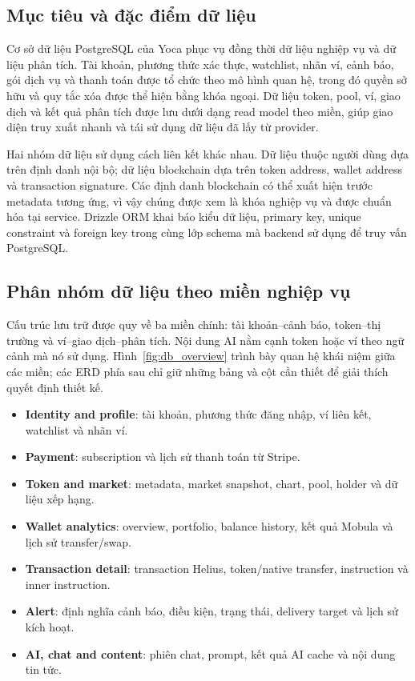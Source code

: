 \subsection{Mục tiêu và đặc điểm dữ liệu}
\label{subsec:db_muc_tieu}

Cơ sở dữ liệu PostgreSQL của Yoca phục vụ đồng thời dữ liệu nghiệp vụ và dữ liệu phân tích. Tài khoản, phương thức xác thực, watchlist, nhãn ví, cảnh báo, gói dịch vụ và thanh toán được tổ chức theo mô hình quan hệ, trong đó quyền sở hữu và quy tắc xóa được thể hiện bằng khóa ngoại. Dữ liệu token, pool, ví, giao dịch và kết quả phân tích được lưu dưới dạng read model theo miền, giúp giao diện truy xuất nhanh và tái sử dụng dữ liệu đã lấy từ provider.

Hai nhóm dữ liệu sử dụng cách liên kết khác nhau. Dữ liệu thuộc người dùng dựa trên định danh nội bộ; dữ liệu blockchain dựa trên token address, wallet address và transaction signature. Các định danh blockchain có thể xuất hiện trước metadata tương ứng, vì vậy chúng được xem là khóa nghiệp vụ và được chuẩn hóa tại service. Drizzle ORM khai báo kiểu dữ liệu, primary key, unique constraint và foreign key trong cùng lớp schema mà backend sử dụng để truy vấn PostgreSQL.

\subsection{Phân nhóm dữ liệu theo miền nghiệp vụ}
\label{subsec:db_phan_nhom}

Cấu trúc lưu trữ được quy về ba miền chính: tài khoản--cảnh báo, token--thị trường và ví--giao dịch--phân tích. Nội dung AI nằm cạnh token hoặc ví theo ngữ cảnh mà nó sử dụng. Hình~\ref{fig:db_overview} trình bày quan hệ khái niệm giữa các miền; các ERD phía sau chỉ giữ những bảng và cột cần thiết để giải thích quyết định thiết kế.

\begin{itemize}
    \item \textbf{Identity and profile}: tài khoản, phương thức đăng nhập, ví liên kết, watchlist và nhãn ví.
    \item \textbf{Payment}: subscription và lịch sử thanh toán từ Stripe.
    \item \textbf{Token and market}: metadata, market snapshot, chart, pool, holder và dữ liệu xếp hạng.
    \item \textbf{Wallet analytics}: overview, portfolio, balance history, kết quả Mobula và lịch sử transfer/swap.
    \item \textbf{Transaction detail}: transaction Helius, token/native transfer, instruction và inner instruction.
    \item \textbf{Alert}: định nghĩa cảnh báo, điều kiện, trạng thái, delivery target và lịch sử kích hoạt.
    \item \textbf{AI, chat and content}: phiên chat, prompt, kết quả AI cache và nội dung tin tức.
\end{itemize}

